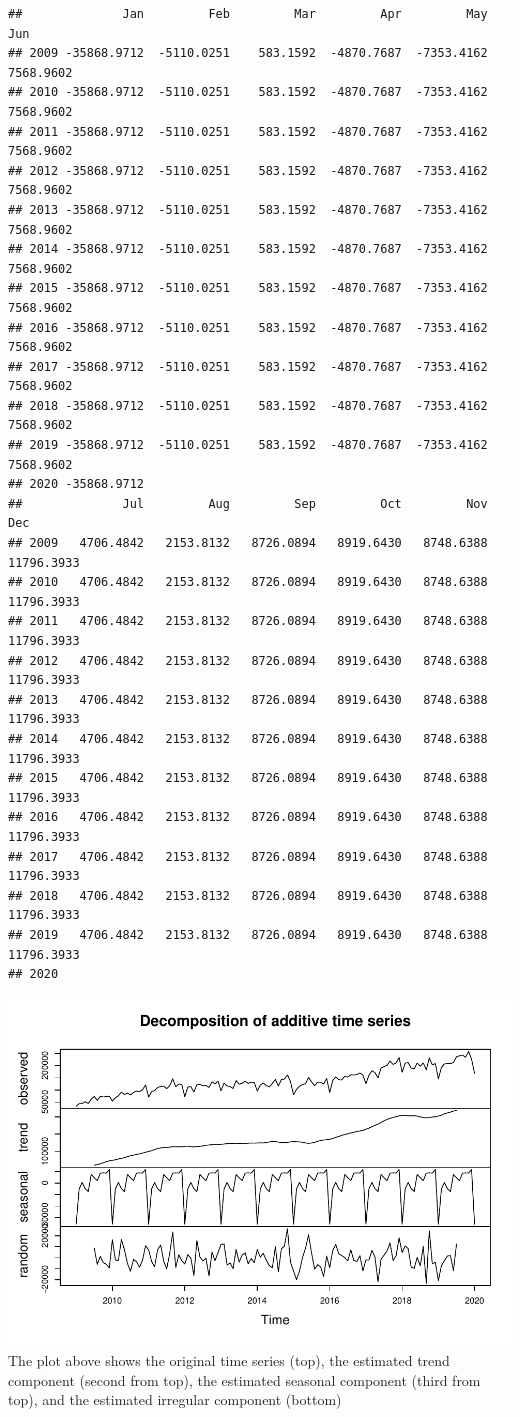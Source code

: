 \documentclass[
]{article}
\begin{document}
\begin{verbatim}
##              Jan         Feb         Mar         Apr         May         Jun
## 2009 -35868.9712  -5110.0251    583.1592  -4870.7687  -7353.4162   7568.9602
## 2010 -35868.9712  -5110.0251    583.1592  -4870.7687  -7353.4162   7568.9602
## 2011 -35868.9712  -5110.0251    583.1592  -4870.7687  -7353.4162   7568.9602
## 2012 -35868.9712  -5110.0251    583.1592  -4870.7687  -7353.4162   7568.9602
## 2013 -35868.9712  -5110.0251    583.1592  -4870.7687  -7353.4162   7568.9602
## 2014 -35868.9712  -5110.0251    583.1592  -4870.7687  -7353.4162   7568.9602
## 2015 -35868.9712  -5110.0251    583.1592  -4870.7687  -7353.4162   7568.9602
## 2016 -35868.9712  -5110.0251    583.1592  -4870.7687  -7353.4162   7568.9602
## 2017 -35868.9712  -5110.0251    583.1592  -4870.7687  -7353.4162   7568.9602
## 2018 -35868.9712  -5110.0251    583.1592  -4870.7687  -7353.4162   7568.9602
## 2019 -35868.9712  -5110.0251    583.1592  -4870.7687  -7353.4162   7568.9602
## 2020 -35868.9712                                                            
##              Jul         Aug         Sep         Oct         Nov         Dec
## 2009   4706.4842   2153.8132   8726.0894   8919.6430   8748.6388  11796.3933
## 2010   4706.4842   2153.8132   8726.0894   8919.6430   8748.6388  11796.3933
## 2011   4706.4842   2153.8132   8726.0894   8919.6430   8748.6388  11796.3933
## 2012   4706.4842   2153.8132   8726.0894   8919.6430   8748.6388  11796.3933
## 2013   4706.4842   2153.8132   8726.0894   8919.6430   8748.6388  11796.3933
## 2014   4706.4842   2153.8132   8726.0894   8919.6430   8748.6388  11796.3933
## 2015   4706.4842   2153.8132   8726.0894   8919.6430   8748.6388  11796.3933
## 2016   4706.4842   2153.8132   8726.0894   8919.6430   8748.6388  11796.3933
## 2017   4706.4842   2153.8132   8726.0894   8919.6430   8748.6388  11796.3933
## 2018   4706.4842   2153.8132   8726.0894   8919.6430   8748.6388  11796.3933
## 2019   4706.4842   2153.8132   8726.0894   8919.6430   8748.6388  11796.3933
## 2020
\end{verbatim}

\includegraphics{tsf_export_files/figure-latex/unnamed-chunk-8-1.pdf}
The plot above shows the original time series (top), the estimated trend
component (second from top), the estimated seasonal component (third
from top), and the estimated irregular component (bottom)
\end{document}
